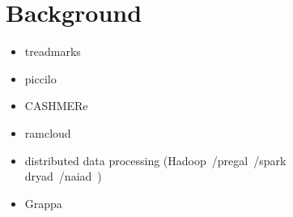 \section{Background}
\label{sec:background}

\begin{itemize}
    \item treadmarks~\cite{Keleher1994}  \\
    \item piccilo~\cite{piccolo}   \\
    \item CASHMERe ~\cite{cashmere}   \\
    \item ramcloud~\cite{Ousterhout:2015:RSS:2818727.2806887}  \\
    \item distributed data processing (Hadoop~\cite{Dean2004}/pregal~\cite{Malewicz:2010:PSL:1807167.1807184}/spark~\cite{180560} \\ dryad~\cite{Isard:2007:DDD:1272996.1273005}/naiad~\cite{Murray2013})  \\
    \item Grappa~\cite{Nelson2015} \\
\end{itemize}
